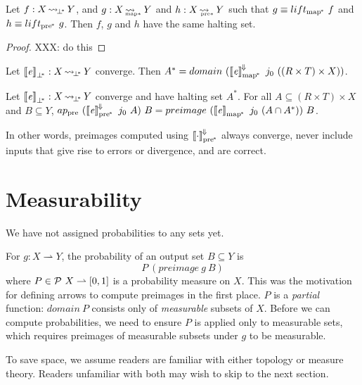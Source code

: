 \documentclass[preprint]{sigplanconf}
\newcommand{\arrow}{\rightsquigarrow}
\newcommand{\pto}{\rightharpoonup}
\newcommand{\conv}{^{\mspace{-2mu}\Downarrow\mspace{-2mu}}}
\newcommand{\meaningofconv}[1]{\left\llbracket{#1}\right\rrbracket\conv}
\newcommand{\arrowlift}{\ensuremath{lift}}
\newcommand{\pre}{_\mathrm{pre}}
\newcommand{\pbot}{{\bot^{\mspace{-4mu}*}}}
\DeclareMathOperator{\pbotto}{\arrow_{\mspace{-3mu}\pbot}}
\newcommand{\pmap}{_\mathrm{map^{\mspace{-2mu}*}}}
\DeclareMathOperator{\pmapto}{\arrow_{\mspace{-22mu}_{\mathrm{map*}}}}
\newcommand{\liftpmap}{\arrowlift\pmap}
\newcommand{\ppre}{_\mathrm{pre^{\mspace{-2mu}*}}}
\DeclareMathOperator{\ppreto}{\arrow_{\mspace{-19mu}_{\mathrm{pre*}}}}
\newcommand{\liftppre}{\arrowlift\ppre}
\begin{document}
\begin{theorem}
Let $f : X \pbotto Y$, and $g : X \pmapto Y$ and $h : X \ppreto Y$ such that $g \equiv \liftpmap~f$ and $h \equiv \liftppre~g$.
Then $f$, $g$ and $h$ have the same halting set.
\end{theorem}
\begin{proof}
XXX: do this
\end{proof}

\begin{corollary}
Let $\meaningof{\mathit{e}}_\pbot : X \pbotto Y$ converge.
Then $A^* = domain~(\meaningofconv{\mathit{e}}\pmap~j_0~((R \times T) \times X))$.
\end{corollary}

\begin{corollary}
Let $\meaningof{\mathit{e}}_\pbot : X \pbotto Y$ converge and have halting set $A^*$.
For all $A \subseteq (R \times T) \times X$ and $B \subseteq Y$, $ap\pre~(\meaningofconv{\mathit{e}}\ppre~j_0~A)~B = preimage~(\meaningof{\mathit{e}}\pmap~j_0~(A \i A^*))~B$.
\end{corollary}

In other words, preimages computed using $\meaningofconv{\cdot}\ppre$ always converge, never include inputs that give rise to errors or divergence, and are correct.

\section{Measurability}
\label{sec:measurability}

We have not assigned probabilities to any sets yet.

For $g : X \pto Y$, the probability of an output set $B \subseteq Y$ is
\begin{equation}
	P~(preimage~g~B)
\end{equation}
where $P \in \powerset~X \pto [0,1]$ is a probability measure on $X$.
This was the motivation for defining arrows to compute preimages in the first place.
$P$ is a \emph{partial} function: $domain~P$ consists only of \emph{measurable} subsets of $X$.
Before we can compute probabilities, we need to ensure $P$ is applied only to measurable sets, which requires preimages of measurable subsets under $g$ to be measurable.

To save space, we assume readers are familiar with either topology or measure theory.
Readers unfamiliar with both may wish to skip to the next section.
\end{document}
